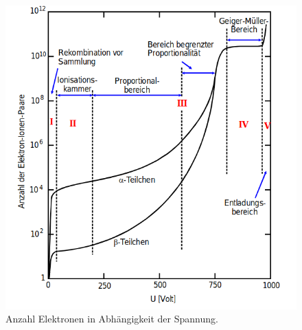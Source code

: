 \begin{figure}
  \centering
  \includegraphics[scale=0.4]{b.png}
  \caption{Anzahl Elektronen in Abhängigkeit der Spannung. \cite{Q1}}
  \label{abb:2}
\end{figure}


